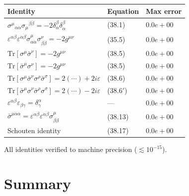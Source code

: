 \documentclass[12pt]{article}
\begin{document}
\begin{center}
\renewcommand{\arraystretch}{1.5}
\begin{tabular}{@{}lll@{}}
  \toprule
  Identity & Equation & Max error \\
  \midrule
  $\sigma^\mu{}_{\alpha\dot\alpha}\sigma_\mu{}^{\beta\dot\beta}=-2\delta_\alpha^\beta\delta_{\dot\alpha}^{\dot\beta}$
    & (38.1) & $0.0e+00$ \\
  $\varepsilon^{\alpha\beta}\varepsilon^{\dot\alpha\dot\beta}\sigma^\mu_{\alpha\dot\alpha}\sigma^\nu_{\beta\dot\beta}=-2g^{\mu\nu}$
    & (35.5) & $0.0e+00$ \\
  $\mathrm{Tr}[\sigma^\mu\bar\sigma^\nu]=-2g^{\mu\nu}$
    & (38.5) & $0.0e+00$ \\
  $\mathrm{Tr}[\bar\sigma^\mu\sigma^\nu]=-2g^{\mu\nu}$
    & (38.5) & $0.0e+00$ \\
  $\mathrm{Tr}[\sigma^\mu\bar\sigma^\nu\sigma^\rho\bar\sigma^\sigma]=2(\cdots)+2i\varepsilon$
    & (38.6) & $0.0e+00$ \\
  $\mathrm{Tr}[\bar\sigma^\mu\sigma^\nu\bar\sigma^\rho\sigma^\sigma]=2(\cdots)-2i\varepsilon$
    & (38.6$'$) & $0.0e+00$ \\
  $\varepsilon^{\alpha\beta}\varepsilon_{\beta\gamma}=\delta^\alpha_\gamma$
    & --- & $0.0e+00$ \\
  $\bar\sigma^{\mu\dot\alpha\alpha}=\varepsilon^{\alpha\beta}\varepsilon^{\dot\alpha\dot\beta}\sigma^\mu_{\beta\dot\beta}$
    & (38.13) & $0.0e+00$ \\
  Schouten identity & (38.17) & $0.0e+00$ \\
  \bottomrule
\end{tabular}
\end{center}

All identities verified to machine precision ($\lesssim 10^{-15}$).

\section{Summary}
\end{document}
